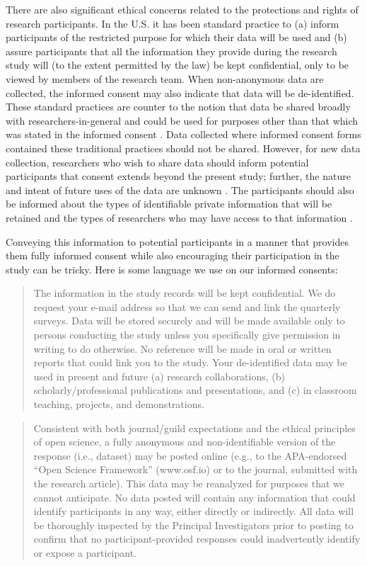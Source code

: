 \documentclass[
  11pt,
]{book}
\begin{document}
There are also significant ethical concerns related to the protections and rights of research participants. In the U.S. it has been standard practice to (a) inform participants of the restricted purpose for which their data will be used and (b) assure participants that all the information they provide during the research study will (to the extent permitted by the law) be kept confidential, only to be viewed by members of the research team. When non-anonymous data are collected, the informed consent may also indicate that data will be de-identified. These standard practices are counter to the notion that data be shared broadly with researchers-in-general and could be used for purposes other than that which was stated in the informed consent \citep{ross_ethical_2018}. Data collected where informed consent forms contained these traditional practices should not be shared. However, for new data collection, researchers who wish to share data should inform potential participants that consent extends beyond the present study; further, the nature and intent of future uses of the data are unknown \citep{ross_ethical_2018}. The participants should also be informed about the types of identifiable private information that will be retained and the types of researchers who may have access to that information \citep{alter_responsible_2018}.

Conveying this information to potential participants in a manner that provides them fully informed consent while also encouraging their participation in the study can be tricky. Here is some language we use on our informed consents:

\begin{quote}
The information in the study records will be kept confidential. We do request your e-mail address so that we can send and link the quarterly surveys. Data will be stored securely and will be made available only to persons conducting the study unless you specifically give permission in writing to do otherwise. No reference will be made in oral or written reports that could link you to the study. Your de-identified data may be used in present and future (a) research collaborations, (b) scholarly/professional publications and presentations, and (c) in classroom teaching, projects, and demonstrations.
\end{quote}

\begin{quote}
Consistent with both journal/guild expectations and the ethical principles of open science, a fully anonymous and non-identifiable version of the response (i.e., dataset) may be posted online (e.g., to the APA-endorsed ``Open Science Framework'' (www.osf.io) or to the journal, submitted with the research article). This data may be reanalyzed for purposes that we cannot anticipate. No data posted will contain any information that could identify participants in any way, either directly or indirectly. All data will be thoroughly inspected by the Principal Investigators prior to posting to confirm that no participant-provided responses could inadvertently identify or expose a participant.
\end{quote}
\end{document}
